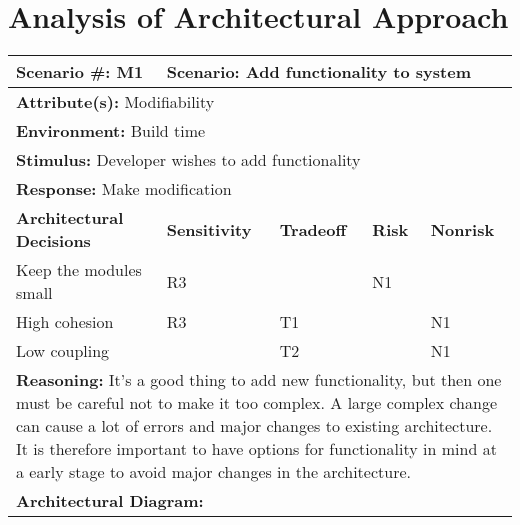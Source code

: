 \section{Analysis of Architectural Approach}


\begin{tabular}{|m{}|m{}|m{}|m{}|m{}|m{}|}
  \hline
  {\bf Scenario \#:} M1 & \multicolumn{5}{m{0.75 \textwidth}|}{{\bf Scenario:} Add functionality to system} \\ \hline
  \multicolumn{6}{|m{0.9 \textwidth}|}{{\bf Attribute(s):} Modifiability} \\ \hline
  \multicolumn{6}{|m{0.9 \textwidth}|}{{\bf Environment:} Build time} \\ \hline
  \multicolumn{6}{|m{0.9 \textwidth}|}{{\bf Stimulus:} Developer wishes to add functionality} \\ \hline
  \multicolumn{6}{|m{0.9 \textwidth}|}{{\bf Response:} Make modification} \\ \hline
  \multicolumn{2}{|m{0.3 \textwidth}|}{\bf Architectural Decisions} & {\bf Sensitivity} & {\bf Tradeoff} & {\bf Risk} & {\bf Nonrisk} \\ \hline
  \multicolumn{2}{|m{0.3 \textwidth}|}{Keep the modules small} & R3 &  & N1 &  \\ \hline
  \multicolumn{2}{|m{0.3 \textwidth}|}{High cohesion} & R3 & T1 &  & N1 \\ \hline
  \multicolumn{2}{|m{0.3 \textwidth}|}{Low coupling} &  & T2 &  & N1 \\ \hline
  \multicolumn{6}{|m{0.9 \textwidth}|}{{\bf Reasoning:} It's a good thing to add new functionality, but then one must be careful not to make 
    it too complex. A large complex change can cause a lot of errors and major changes to existing architecture. It is therefore important
    to have options for functionality in mind at a early stage to avoid major changes in the architecture.} \\ \hline
  \multicolumn{6}{|m{0.9 \textwidth}|}{{\bf Architectural Diagram:} } \\ \hline
\end{tabular}



